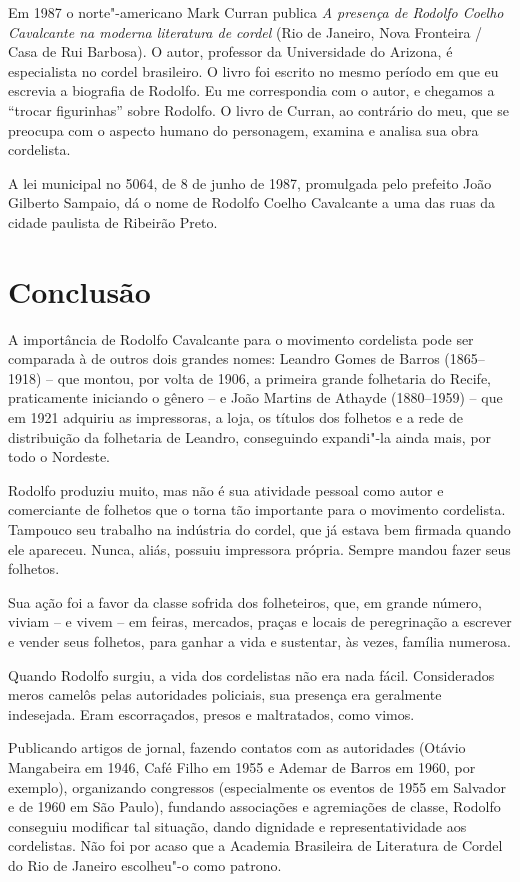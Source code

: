 Em 1987 o norte"-americano Mark Curran publica \textit{A presença de
Rodolfo Coelho Cavalcante na moderna literatura de cordel} (Rio de
Janeiro, Nova Fronteira / Casa de Rui Barbosa). O autor, professor da
Universidade do Arizona, é especialista no cordel brasileiro. O livro
foi escrito no mesmo período em que eu escrevia a biografia de Rodolfo.
Eu me correspondia com o autor, e chegamos a ``trocar
figurinhas'' sobre Rodolfo. O livro de Curran, ao
contrário do meu, que se preocupa com o aspecto humano do personagem,
examina e analisa sua obra cordelista.

A lei municipal no 5064, de 8 de junho de 1987, promulgada pelo
prefeito João Gilberto Sampaio, dá o nome de Rodolfo Coelho Cavalcante
a uma das ruas da cidade paulista de Ribeirão Preto.

\section{Conclusão}

A importância de Rodolfo Cavalcante para o movimento cordelista pode ser
comparada à de outros dois grandes nomes: Leandro Gomes de Barros
(1865--1918) -- que montou, por volta de 1906, a primeira grande
folhetaria do Recife, praticamente iniciando o gênero -- e João
Martins de Athayde (1880--1959)  -- que em 1921 adquiriu as
impressoras, a loja, os títulos dos folhetos e a rede de distribuição
da folhetaria de Leandro, conseguindo expandi"-la ainda mais, por todo
o Nordeste.

Rodolfo produziu muito, mas não é sua atividade pessoal como autor e
comerciante de folhetos que o torna tão importante para o movimento
cordelista. Tampouco seu trabalho na indústria do cordel, que já estava
bem firmada quando ele apareceu. Nunca, aliás, possuiu impressora
própria. Sempre mandou fazer seus folhetos.

Sua ação foi a favor da classe sofrida dos folheteiros, que, em grande
número, viviam -- e vivem -- em feiras, mercados, praças e locais
de peregrinação a escrever e vender seus folhetos, para ganhar a vida e
sustentar, às vezes, família numerosa.

Quando Rodolfo surgiu, a vida dos cordelistas não era nada fácil.
Considerados meros camelôs pelas autoridades policiais, sua presença
era geralmente indesejada. Eram escorraçados, presos e maltratados,
como vimos.

Publicando artigos de jornal, fazendo contatos com as autoridades
(Otávio Mangabeira em 1946, Café Filho em 1955 e Ademar de Barros em
1960, por exemplo), organizando congressos (especialmente os eventos de
1955 em Salvador e de 1960 em São Paulo), fundando associações e
agremiações de classe, Rodolfo conseguiu modificar tal situação, dando
dignidade e representatividade aos cordelistas. Não foi por acaso que a
Academia Brasileira de Literatura de Cordel do Rio de Janeiro
escolheu"-o como patrono.

